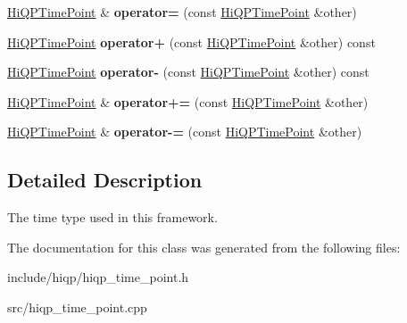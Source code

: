 \begin{DoxyCompactItemize}
\item 
\hypertarget{classhiqp_1_1HiQPTimePoint_a647e64067a25f8a1d981d304d94295e8}{\hyperlink{classhiqp_1_1HiQPTimePoint}{Hi\-Q\-P\-Time\-Point} \& {\bfseries operator=} (const \hyperlink{classhiqp_1_1HiQPTimePoint}{Hi\-Q\-P\-Time\-Point} \&other)}\label{classhiqp_1_1HiQPTimePoint_a647e64067a25f8a1d981d304d94295e8}

\item 
\hypertarget{classhiqp_1_1HiQPTimePoint_a813483d1fa797b8bebbaefc9cd27870d}{\hyperlink{classhiqp_1_1HiQPTimePoint}{Hi\-Q\-P\-Time\-Point} {\bfseries operator+} (const \hyperlink{classhiqp_1_1HiQPTimePoint}{Hi\-Q\-P\-Time\-Point} \&other) const }\label{classhiqp_1_1HiQPTimePoint_a813483d1fa797b8bebbaefc9cd27870d}

\item 
\hypertarget{classhiqp_1_1HiQPTimePoint_a61ceef1e9ddeec9e978475bd5f0e48dd}{\hyperlink{classhiqp_1_1HiQPTimePoint}{Hi\-Q\-P\-Time\-Point} {\bfseries operator-\/} (const \hyperlink{classhiqp_1_1HiQPTimePoint}{Hi\-Q\-P\-Time\-Point} \&other) const }\label{classhiqp_1_1HiQPTimePoint_a61ceef1e9ddeec9e978475bd5f0e48dd}

\item 
\hypertarget{classhiqp_1_1HiQPTimePoint_a708129ca0c4ff820f74b038b154d2525}{\hyperlink{classhiqp_1_1HiQPTimePoint}{Hi\-Q\-P\-Time\-Point} \& {\bfseries operator+=} (const \hyperlink{classhiqp_1_1HiQPTimePoint}{Hi\-Q\-P\-Time\-Point} \&other)}\label{classhiqp_1_1HiQPTimePoint_a708129ca0c4ff820f74b038b154d2525}

\item 
\hypertarget{classhiqp_1_1HiQPTimePoint_a3c4c20abe8dfe903154267465de2fd18}{\hyperlink{classhiqp_1_1HiQPTimePoint}{Hi\-Q\-P\-Time\-Point} \& {\bfseries operator-\/=} (const \hyperlink{classhiqp_1_1HiQPTimePoint}{Hi\-Q\-P\-Time\-Point} \&other)}\label{classhiqp_1_1HiQPTimePoint_a3c4c20abe8dfe903154267465de2fd18}

\end{DoxyCompactItemize}


\subsection{Detailed Description}
The time type used in this framework. 

The documentation for this class was generated from the following files\-:\begin{DoxyCompactItemize}
\item 
include/hiqp/hiqp\-\_\-time\-\_\-point.\-h\item 
src/hiqp\-\_\-time\-\_\-point.\-cpp\end{DoxyCompactItemize}
